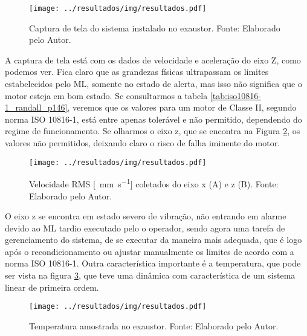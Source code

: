 \documentclass[a4paper]{ifacconf}
\begin{document}
\begin{figure}[h!]
  \begin{center}
      \texttt{[image: ../resultados/img/resultados.pdf]}
  \end{center}
  \caption{Captura de tela do sistema instalado no exaustor. Fonte: Elaborado pelo Autor.}
  \label{fig:exaustor_1}
\end{figure}

A captura de tela está com os dados de velocidade e aceleração do eixo Z, como podemos ver. Fica claro que as grandezas físicas
ultrapassam os limites estabelecidos pelo ML, somente no estado de alerta, mas isso não significa que o motor esteja em bom estado.
Se consultarmos a tabela \ref{tab:iso10816-1_randall_p146}, veremos que os valores para um motor de Classe II, segundo norma  ISO 10816-1, está 
entre apenas tolerável e não permitido, dependendo do regime de funcionamento. 
Se olharmos o eixo z, que se encontra na Figura \ref{fig:exaustor_xz}, os valores não permitidos, deixando claro o risco de falha iminente do 
motor.

\begin{figure}[h!]
  \begin{center}
      \texttt{[image: ../resultados/img/resultados.pdf]}
  \end{center}
  \caption{Velocidade RMS [\SI{}{\milli\metre\per\second}] coletados do eixo x (A) e z (B). Fonte: Elaborado pelo Autor.}
  \label{fig:exaustor_xz}
\end{figure}

O eixo z se encontra em estado severo de vibração, não entrando em alarme devido ao ML tardio executado
pelo o operador, sendo agora uma tarefa de gerenciamento do sistema, de se executar da maneira mais adequada, que é logo após o recondicionamento 
ou ajustar manualmente os limites de acordo com a norma ISO 10816-1. Outra característica importante é a temperatura, que pode ser vista na 
figura \ref{fig:exaustor_temperatura}, que teve uma dinâmica com característica de um sistema linear de primeira ordem.


\begin{figure}[h!]
  \begin{center}
      \texttt{[image: ../resultados/img/resultados.pdf]}
  \end{center}
  \caption{Temperatura amostrada no exaustor. Fonte: Elaborado pelo Autor.}
  \label{fig:exaustor_temperatura}
\end{figure}
\end{document}

